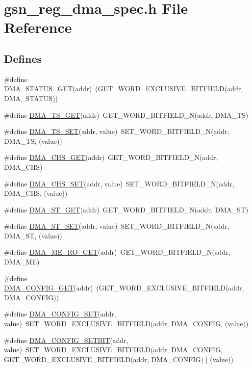 \hypertarget{a00548}{
\section{gsn\_\-reg\_\-dma\_\-spec.h File Reference}
\label{a00548}
}
\subsection*{Defines}
\begin{DoxyCompactItemize}
\item 
\#define \hyperlink{a00548_a536a0569b69b2338c968d3e3e95713a1}{DMA\_\-STATUS\_\-GET}(addr)~(GET\_\-WORD\_\-EXCLUSIVE\_\-BITFIELD(addr, DMA\_\-STATUS))
\item 
\#define \hyperlink{a00548_abdc028e92c227552bee727cf38356929}{DMA\_\-TS\_\-GET}(addr)~GET\_\-WORD\_\-BITFIELD\_\-N(addr, DMA\_\-TS)
\item 
\#define \hyperlink{a00548_a1b007103ced38b2b77dd52ba31b76167}{DMA\_\-TS\_\-SET}(addr, value)~SET\_\-WORD\_\-BITFIELD\_\-N(addr, DMA\_\-TS, (value))
\item 
\#define \hyperlink{a00548_a9ac3aef833176207d89dff7ec7065b4b}{DMA\_\-CHS\_\-GET}(addr)~GET\_\-WORD\_\-BITFIELD\_\-N(addr, DMA\_\-CHS)
\item 
\#define \hyperlink{a00548_a4ed4b36a06e05d67902bc528e6f1969e}{DMA\_\-CHS\_\-SET}(addr, value)~SET\_\-WORD\_\-BITFIELD\_\-N(addr, DMA\_\-CHS, (value))
\item 
\#define \hyperlink{a00548_add7dbff5a0618ca68dec41b3e0a95753}{DMA\_\-ST\_\-GET}(addr)~GET\_\-WORD\_\-BITFIELD\_\-N(addr, DMA\_\-ST)
\item 
\#define \hyperlink{a00548_a354e7e406e1cc9173fe0abc7926801bb}{DMA\_\-ST\_\-SET}(addr, value)~SET\_\-WORD\_\-BITFIELD\_\-N(addr, DMA\_\-ST, (value))
\item 
\#define \hyperlink{a00548_a284df5222e8635cdaca838a0493e83f0}{DMA\_\-ME\_\-RO\_\-GET}(addr)~GET\_\-WORD\_\-BITFIELD\_\-N(addr, DMA\_\-ME)
\item 
\#define \hyperlink{a00548_a836a53f2c52eb0f10e7c96a3da460d0b}{DMA\_\-CONFIG\_\-GET}(addr)~(GET\_\-WORD\_\-EXCLUSIVE\_\-BITFIELD(addr, DMA\_\-CONFIG))
\item 
\#define \hyperlink{a00548_a87ad40f87384a6dc99d9abe0c3323106}{DMA\_\-CONFIG\_\-SET}(addr, value)~SET\_\-WORD\_\-EXCLUSIVE\_\-BITFIELD(addr, DMA\_\-CONFIG, (value))
\item 
\#define \hyperlink{a00548_ab9c443bb7343ab2814c3b333453892d5}{DMA\_\-CONFIG\_\-SETBIT}(addr, value)~SET\_\-WORD\_\-EXCLUSIVE\_\-BITFIELD(addr, DMA\_\-CONFIG, GET\_\-WORD\_\-EXCLUSIVE\_\-BITFIELD(addr, DMA\_\-CONFIG) $|$ (value))

\end{DoxyCompactItemize}
